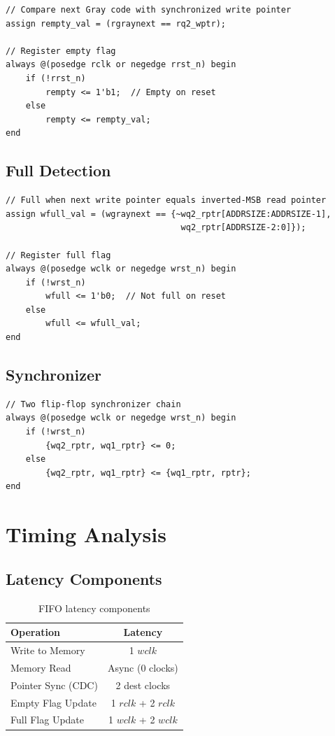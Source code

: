 \documentclass[12pt,a4paper]{article}
\begin{document}
\begin{lstlisting}[caption=Empty Detection Logic]
// Compare next Gray code with synchronized write pointer
assign rempty_val = (rgraynext == rq2_wptr);

// Register empty flag
always @(posedge rclk or negedge rrst_n) begin
    if (!rrst_n)
        rempty <= 1'b1;  // Empty on reset
    else
        rempty <= rempty_val;
end
\end{lstlisting}

\subsection{Full Detection}

\begin{lstlisting}[caption=Full Detection Logic]
// Full when next write pointer equals inverted-MSB read pointer
assign wfull_val = (wgraynext == {~wq2_rptr[ADDRSIZE:ADDRSIZE-1],
                                   wq2_rptr[ADDRSIZE-2:0]});

// Register full flag
always @(posedge wclk or negedge wrst_n) begin
    if (!wrst_n)
        wfull <= 1'b0;  // Not full on reset
    else
        wfull <= wfull_val;
end
\end{lstlisting}

\subsection{Synchronizer}

\begin{lstlisting}[caption=Two-Stage Synchronizer]
// Two flip-flop synchronizer chain
always @(posedge wclk or negedge wrst_n) begin
    if (!wrst_n)
        {wq2_rptr, wq1_rptr} <= 0;
    else
        {wq2_rptr, wq1_rptr} <= {wq1_rptr, rptr};
end
\end{lstlisting}

\section{Timing Analysis}

\subsection{Latency Components}

\begin{table}[h]
\centering
\begin{tabular}{|l|c|}
\hline
\textbf{Operation} & \textbf{Latency} \\
\hline
Write to Memory & 1 $wclk$ \\
Memory Read & Async (0 clocks) \\
Pointer Sync (CDC) & 2 dest clocks \\
Empty Flag Update & 1 $rclk$ + 2 $rclk$ \\
Full Flag Update & 1 $wclk$ + 2 $wclk$ \\
\hline
\end{tabular}
\caption{FIFO latency components}
\end{table}
\end{document}
